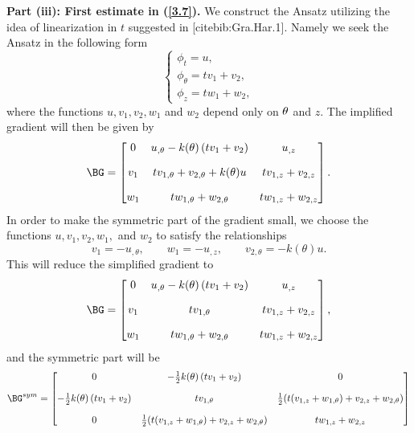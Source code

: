 \noindent \textbf{Part (iii): First estimate in (\ref{3.7}).} We construct the Ansatz utilizing the idea of linearization in $t$ suggested in [cite{bib:Gra.Har.1}]. Namely we seek the Ansatz in the following form 
\begin{equation}
\label{4.47}
\begin{cases}
\phi_t=u,\\
\phi_\theta=tv_1+v_2,\\
\phi_z=tw_1+w_2,
\end{cases}
\end{equation}
where the functions $u,v_1,v_2,w_1$ and $w_2$ depend only on $\theta$ and $z.$ The implified gradient will then be given by 
\begin{equation*}
\BG=
\begin{bmatrix} 
0       &       u_{,\Gth}-k(\theta)\left(tv_1+v_2\right)     &      u_{,z} \\[10pt]
v_1    &        tv_{1,\theta}+v_{2,\Gth}+k(\Gth)u           &        tv_{1,z}+v_{2,z}\\[10pt]
w_1    &      tw_{1,\theta}+w_{2,\theta}                        &          tw_{1,z}+w_{2,z}
\end{bmatrix}.
\end{equation*}
In order to make the symmetric part of the gradient small, we choose the functions $u,v_1,v_2,w_1,$ and $w_2$ to satisfy the relationships
\begin{equation}
\label{4.48}
v_1=-u_{,\theta},\qquad w_1=-u_{,z},\qquad v_{2,\theta}=-k(\theta)u.
\end{equation}
This will reduce the simplified gradient to 
\begin{equation}
\label{4.49}
\BG=
\begin{bmatrix} 
0       &       u_{,\Gth}-k(\theta)\left(tv_1+v_2\right)     &      u_{,z} \\[10pt]
v_1    &        tv_{1,\theta}         &        tv_{1,z}+v_{2,z}\\[10pt]
w_1    &      tw_{1,\theta}+w_{2,\theta}                        &          tw_{1,z}+w_{2,z}
\end{bmatrix},
\end{equation}
and the symmetric part will be
\begin{equation}
\label{4.50}
\BG^{sym}=
\begin{bmatrix} 
0       &      -\frac{1}{2}k(\theta)\left(tv_1+v_2\right)    &    0 \\[10pt]
-\frac{1}{2}k(\theta)\left(tv_1+v_2\right)    &     tv_{1,\theta}    &      \frac{1}{2}( t(v_{1,z}+w_{1,\theta})+v_{2,z}+w_{2,\theta})\\[10pt]
0      &    \frac{1}{2}( t(v_{1,z}+w_{1,\theta})+v_{2,z}+w_{2,\theta})    &      tw_{1,z}+w_{2,z}
\end{bmatrix} 
\end{equation}

